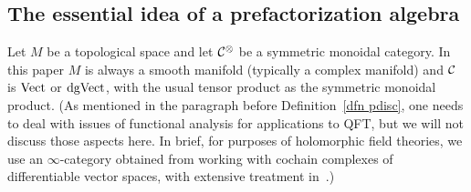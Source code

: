 \documentclass[11pt]{amsart}
\begin{document}
\subsection{The essential idea of a prefactorization algebra}

Let $M$ be a topological space and let $\mathcal{C}^\otimes$ be a symmetric monoidal category. 
In this paper $M$ is always a smooth manifold (typically a complex manifold) and $\mathcal{C}$ is ${\rm Vect}$ or ${\rm dgVect}$, with the usual tensor product as the symmetric monoidal product.
(As mentioned in the paragraph before Definition~\ref{dfn pdisc}, one needs to deal with issues of functional analysis for applications to QFT, but we will not discuss those aspects here.
In brief, for purposes of holomorphic field theories, we use an $\infty$-category obtained from working with cochain complexes of differentiable vector spaces, with extensive treatment in~\cite{CG1}.)
\end{document}
